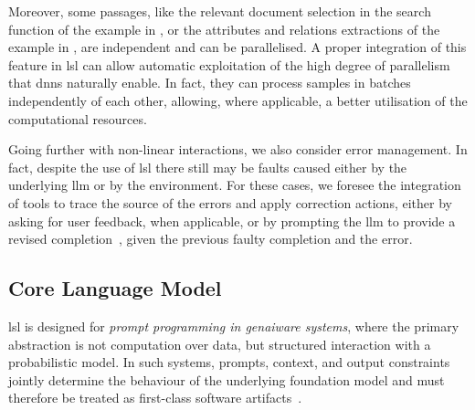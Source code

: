 \documentclass[manuscript,screen]{acmart}
\begin{document}
Moreover, some passages, like the relevant document selection in the search function of the example in , or the attributes and relations extractions of the example in , are independent and can be parallelised.
A proper integration of this feature in \ac{lsl} can allow automatic exploitation of the high degree of parallelism that \acp{dnn} naturally enable.
In fact, they can process samples in batches independently of each other, allowing, where applicable, a better utilisation of the computational resources.

Going further with non-linear interactions, we also consider error management.
In fact, despite the use of \ac{lsl} there still may be faults caused either by the underlying \ac{llm} or by the environment.
For these cases, we foresee the integration of tools to trace the source of the errors and apply correction actions, either by asking for user feedback, when applicable, or by prompting the \ac{llm} to provide a revised completion~\cite{DBLP:conf/nips/ShinnCGNY23}, given the previous faulty completion and the error.

\subsection{Core Language Model}
\label{sec:corelanguagemodel}



\ac{lsl} is designed for \emph{prompt programming in \ac{genai}ware systems}, where the primary abstraction is not computation over data, but structured interaction with a probabilistic model. 
In such systems, prompts, context, and output constraints jointly determine the behaviour of the underlying foundation model and must therefore be treated as first-class software artifacts~\cite{llm_se_roadmap}.
\end{document}
